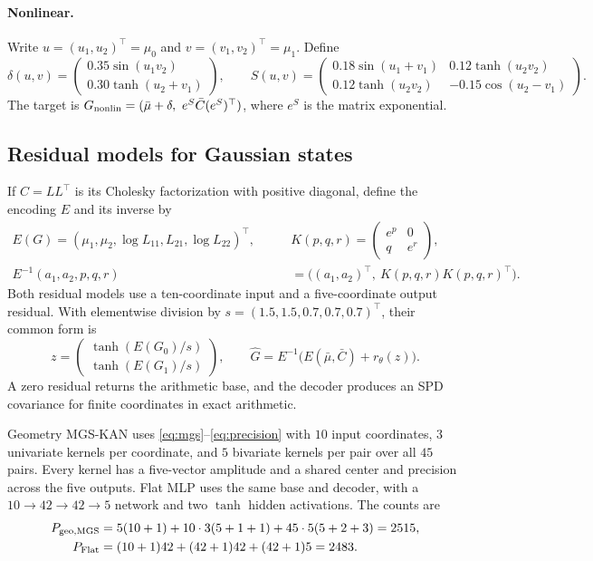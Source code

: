 \documentclass[11pt]{article}
\let\StudyMathSubsection\subsection
\begin{document}
\paragraph{Nonlinear.}
Write \(u=(u_1,u_2)^\top=\mu_0\) and \(v=(v_1,v_2)^\top=\mu_1\).
Define
\[
 \delta(u,v)=\begin{pmatrix}0.35\sin(u_1v_2)\\0.30\tanh(u_2+v_1)\end{pmatrix},
 \qquad
 S(u,v)=\begin{pmatrix}
 0.18\sin(u_1+v_1)&0.12\tanh(u_2v_2)\\
 0.12\tanh(u_2v_2)&-0.15\cos(u_2-v_1)
 \end{pmatrix}.
\]
The target is \(G_{\rm nonlin}=(\bar\mu+\delta,\ e^S\bar C(e^S)^\top)\),
where \(e^S\) is the matrix exponential.

\StudyMathSubsection{Residual models for Gaussian states}

If \(C=LL^\top\) is its Cholesky factorization with positive diagonal,
define the encoding \(E\) and its inverse by
\begin{align}
 E(G)=(\mu_1,\mu_2,\log L_{11},L_{21},\log L_{22})^\top,\qquad
 &K(p,q,r)=\begin{pmatrix}e^p&0\\q&e^r\end{pmatrix},\nonumber\\
 E^{-1}(a_1,a_2,p,q,r)&=\bigl((a_1,a_2)^\top,\ K(p,q,r)K(p,q,r)^\top\bigr).
 \label{eq:gaussian-code}
\end{align}
Both residual models use a ten-coordinate input and a five-coordinate
output residual. With elementwise division by
\(s=(1.5,1.5,0.7,0.7,0.7)^\top\), their common form is
\[
 z=\begin{pmatrix}\tanh(E(G_0)/s)\\\tanh(E(G_1)/s)\end{pmatrix},
 \qquad
 \widehat G=E^{-1}\bigl(E(\bar\mu,\bar C)+r_\theta(z)\bigr).
\]
A zero residual returns the arithmetic base, and the decoder produces an
SPD covariance for finite coordinates in exact arithmetic.

Geometry MGS-KAN uses \eqref{eq:mgs}--\eqref{eq:precision} with \(10\)
input coordinates, \(3\) univariate kernels per coordinate, and \(5\)
bivariate kernels per pair over all \(45\) pairs. Every kernel has a
five-vector amplitude and a shared center and precision across the five
outputs. Flat MLP uses the same base and decoder, with a
\(10\to42\to42\to5\) network and two \(\tanh\) hidden activations.
The counts are
\begin{align*}
 P_{\rm geo,MGS}
   &=5(10+1)+10\cdot3(5+1+1)+45\cdot5(5+2+3)=2515,\\
 P_{\rm Flat}
   &=(10+1)42+(42+1)42+(42+1)5=2483.
\end{align*}
\end{document}
